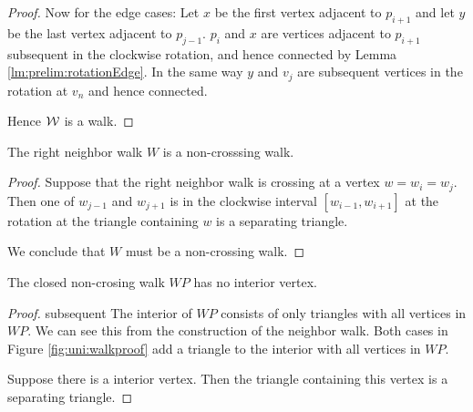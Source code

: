 \begin{proof}
    Now for the edge cases: Let $x$ be the first vertex adjacent to $p_{i+1}$ and let $y$ be the last vertex adjacent to $p_{j-1}$. $p_i$ and $x$ are vertices adjacent to $p_{i+1}$ subsequent in the clockwise rotation, and hence connected by Lemma \ref{lm:prelim:rotationEdge}. In the same way $y$ and $v_j$ are subsequent vertices in the rotation at $v_n$ and hence connected.

    Hence $\mathcal{W}$ is a walk.
  \end{proof}


  \begin{lemma}
    \label{lm:uni:neighborWalkNoncrossing}
    The right neighbor walk $W$ is a non-crosssing walk.
  \end{lemma}
  \begin{proof}
    Suppose that the right neighbor walk is crossing at a vertex $w= w_i =w_j$. Then one of $w_{j-1}$ and $w_{j+1}$ is in the clockwise interval $[w_{i-1}, w_{i+1} ]$ at the rotation at the triangle containing $w$ is a separating triangle.

    We conclude that $W$ must be a non-crossing walk.
  \end{proof}


  \begin{lemma}
    \label{lm:uni:neighbourwalkNoInteriorVertex}
    The closed non-crosing walk $WP$ has no interior vertex.
  \end{lemma}
  \begin{proof}subsequent
    The interior of $WP$ consists of only triangles with all vertices in $WP$. We can see this from the construction of the neighbor walk. Both cases in Figure \ref{fig:uni:walkproof} add a triangle to the interior with all vertices in $WP$.

    Suppose there is a interior vertex. Then the triangle containing this vertex is a separating triangle.
  \end{proof}


